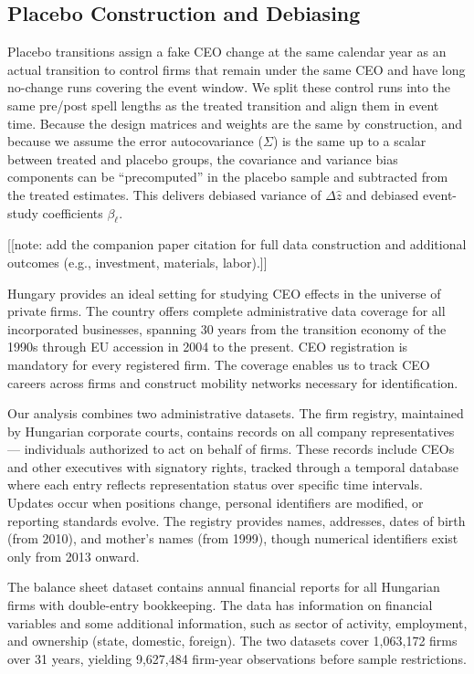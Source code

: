 \documentclass[11pt,a4paper]{article}
\begin{document}
\subsection*{Placebo Construction and Debiasing}
Placebo transitions assign a fake CEO change at the same calendar year as an actual transition to control firms that remain under the same CEO and have long no-change runs covering the event window. We split these control runs into the same pre/post spell lengths as the treated transition and align them in event time. Because the design matrices and weights are the same by construction, and because we assume the error autocovariance (\(\Sigma\)) is the same up to a scalar between treated and placebo groups, the covariance and variance bias components can be “precomputed” in the placebo sample and subtracted from the treated estimates. This delivers debiased variance of \(\Delta \hat z\) and debiased event-study coefficients \(\beta_{\ell}\).

[[note: add the companion paper citation for full data construction and additional outcomes (e.g., investment, materials, labor).]]

Hungary provides an ideal setting for studying CEO effects in the universe of private firms. The country offers complete administrative data coverage for all incorporated businesses, spanning 30 years from the transition economy of the 1990s through EU accession in 2004 to the present. CEO registration is mandatory for every registered firm. The coverage enables us to track CEO careers across firms and construct mobility networks necessary for identification.

Our analysis combines two administrative datasets. The firm registry, maintained by Hungarian corporate courts, contains records on all company representatives — individuals authorized to act on behalf of firms. These records include CEOs and other executives with signatory rights, tracked through a temporal database where each entry reflects representation status over specific time intervals. Updates occur when positions change, personal identifiers are modified, or reporting standards evolve. The registry provides names, addresses, dates of birth (from 2010), and mother's names (from 1999), though numerical identifiers exist only from 2013 onward.

The balance sheet dataset contains annual financial reports for all Hungarian firms with double-entry bookkeeping. The data has information on financial variables and some additional information, such as sector of activity, employment, and ownership (state, domestic, foreign). The two datasets cover 1,063,172 firms over 31 years, yielding 9,627,484 firm-year observations before sample restrictions.
\end{document}
